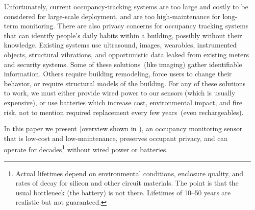 Unfortunately, current occupancy-tracking systems are too large and costly to be considered for large-scale deployment, and are too high-maintenance for long-term monitoring.
There are also privacy concerns for occupancy tracking systems that can identify people's daily habits within a building, possibly without their knowledge.
Existing systems use ultrasound\cite{hnat2012doorjamb}, images\cite{tyndall2016occupancy, teixeira2007lightweight}, wearables\cite{fishkin2005hands}, instrumented objects\cite{buettner2009activity}, structural vibrations\cite{pan2016occupant}, and opportunistic data leaked from existing meters and security systems\cite{yangoccupancy2014}.
Some of these solutions~(like imaging) gather identifiable information.
Others require building remodeling, force users to change their behavior, or require structural models of the building.
For any of these solutions to work, we must either provide wired power to our sensors (which is usually expensive), or use batteries which increase cost, environmental impact, and fire risk, not to mention required replacement every few years~(even rechargeables).

In this paper we present \sysname (overview shown in ), an occupancy monitoring sensor that is low-cost and low-maintenance, preserves occupant privacy, and can operate for decades\footnote{Actual lifetimes depend on environmental conditions, enclosure quality, and rates of decay for silicon and other circuit materials. The point is that the usual bottleneck (the battery) is not there. Lifetimes of 10--50 years are realistic but not guaranteed.} without wired power or batteries.
%


